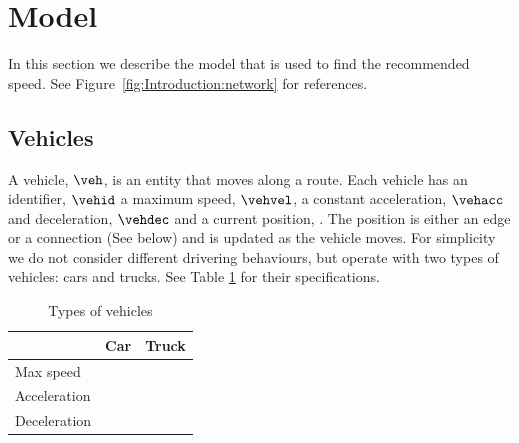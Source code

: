 \section{Model}
In this section we describe the model that is used to find the recommended speed.
See Figure~\ref{fig:Introduction:network} for references.

\subsection{Vehicles}
A vehicle, $\veh$, is an entity that moves along a route.
Each vehicle has an identifier, $\vehid$ a maximum speed, $\vehvel$, a constant acceleration, $\vehacc$ and deceleration, $\vehdec$ and a current position, \vehpos. The position is either an edge or a connection (See below) and is updated as the vehicle moves.
For simplicity we do not consider different drivering behaviours, but operate with two types of vehicles: cars and trucks. See Table \ref{table.vehicleTypes} for their specifications.
\begin{table}
\centering
\begin{tabular}{|l|l|l|}\hline
		& Car 	& Truck \\\hline
Max speed 	& 	& \\\hline
Acceleration 	&	& \\\hline
Deceleration 	&	& \\\hline
\end{tabular}
\caption{Types of vehicles}\label{table.vehicleTypes}
\end{table}

